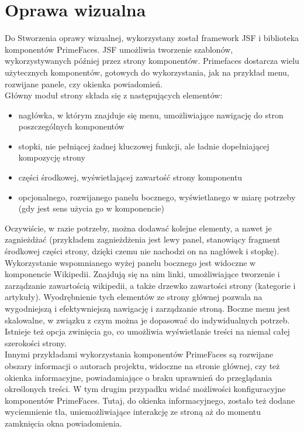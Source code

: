 \documentclass{classrep}
\begin{document}
\section{Oprawa wizualna}
Do Stworzenia oprawy wizualnej, wykorzystany został framework JSF i biblioteka komponentów PrimeFaces. JSF umożliwia tworzenie szablonów, wykorzystywanych później przez strony komponentów. Primefaces dostarcza wielu użytecznych komponentów, gotowych do wykorzystania, jak na przykład menu, rozwijane panele, czy okienka powiadomień.\\
Główny moduł strony składa się z następujących elementów:
\begin{itemize}
  \item nagłówka, w którym znajduje się menu, umożliwiające nawigację do stron poszczególnych komponentów 
  \item stopki, nie pełniącej żadnej kluczowej funkcji, ale ładnie dopełniającej kompozycję strony
  \item części środkowej, wyświetlającej zawartość strony komponentu
  \item opcjonalnego, rozwijanego panelu bocznego, wyświetlanego w miarę potrzeby (gdy jest sens użycia go w komponencie)
\end{itemize}
Oczywiście, w razie potrzeby, można dodawać kolejne elementy, a nawet je zagnieżdżać (przykładem zagnieżdżenia jest lewy panel, stanowiący fragment środkowej części strony, dzięki czemu nie nachodzi on na nagłówek i stopkę).\\
Wykorzystanie wspomnianego wyżej panelu bocznego jest widoczne w komponencie Wikipedii. Znajdują się na nim linki, umożliwiające tworzenie i zarządzanie zawartością wikipedii, a także drzewko zawartości strony (kategorie i artykuły). Wyodrębnienie tych elementów ze strony głównej pozwala na wygodniejszą i efektywniejszą nawigację i zarządzanie stroną. Boczne menu jest skalowalne, w związku z czym można je dopasować do indywidualnych potrzeb. Istnieje też opcja zwinięcia go, co umożliwia wyświetlanie treści na niemal całej szerokości strony.\\
Innymi przykładami wykorzystania komponentów PrimeFaces są rozwijane obszary informacji o autorach projektu, widoczne na stronie głównej, czy też okienka informacyjne, powiadamiające o braku uprawnień do przeglądania określonych treści. W tym drugim przypadku widać możliwości konfiguracyjne komponentów PrimeFaces. Tutaj, do okienka informacyjnego, zostało też dodane wyciemnienie tła, uniemożliwiające interakcję ze stroną aż do momentu zamknięcia okna powiadomienia.
\end{document}

